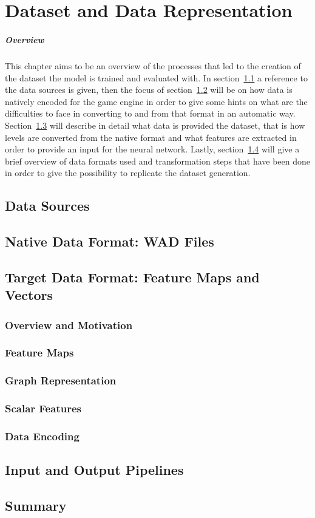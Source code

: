 \chapter{Dataset and Data Representation}
\paragraph{Overview}
This chapter aims to be an overview of the processes that led to the creation of the dataset the model is trained and evaluated with.
In section~\ref{sec:Sources} a reference to the data sources is given, then the focus of section~\ref{sec:WAD} will be on how data is natively encoded for the game engine in order to give some hints on what are the difficulties to face in converting to and from that format in an automatic way. Section~\ref{sec:TargetFormat} will describe in detail what data is provided  the dataset, that is how levels are converted from the native format and what features are extracted in order to provide an input for the neural network. Lastly, section~\ref{sec:I/O} will give a brief overview of data formats used and transformation steps that have been done in order to give the possibility to replicate the dataset generation.
 
\section{Data Sources}
\label{sec:Sources}
\section{Native Data Format: WAD Files}
\label{sec:WAD}
\section{Target Data Format: Feature Maps and Vectors}
\label{sec:TargetFormat}
\subsection{Overview and Motivation}
\subsection{Feature Maps}
\subsection{Graph Representation}
\subsection{Scalar Features}
\subsection{Data Encoding}
\section{Input and Output Pipelines}
\label{sec:I/O}
\section{Summary}